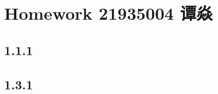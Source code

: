 \documentclass[a4paper]{book}
\makeatletter
\newcommand{\voidenvironment}[1]{%
  \expandafter\providecommand\csname env@#1@save@env\endcsname{}%
  \expandafter\providecommand\csname env@#1@process\endcsname{}%
  \@ifundefined{#1}{}{\RenewEnviron{#1}{}}%
}
\numberwithin{equation}{chapter}
\theoremstyle{definition}
\makeatother
\begin{document}
\pagestyle{empty}
% 



\setcounter{chapter}{0}




\chapter{Homework 21935004 谭焱}

\section{1.1.1}


\section{1.3.1}

\end{document}
